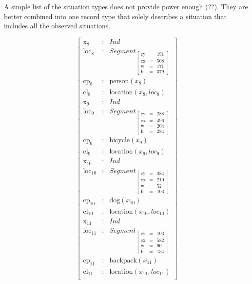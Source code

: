\documentclass[11pt, a4paper]{article}
\begin{document}
A simple list of the situation types does not provide power enough (??).
They are better combined into one record type that solely describes a situation that includes all the observed situations.

\begin{equation}\label{eq:sitmerge}
\left[\begin{array}{rcl}
\text{x}_\text{8} &:& Ind\\
\text{loc}_\text{8} &:& Segment_{\left[\begin{array}{rcl}
	\text{cy} &=& 191\\
	\text{cx} &=& 508\\
	\text{w} &=& 171\\
	\text{h} &=& 379
	\end{array}\right]}\\
\text{cp}_\text{8} &:& \text{person}(x_{8})\\
\text{cl}_\text{8} &:& \text{location}(x_{8}, loc_{8})\\
\text{x}_\text{9} &:& Ind\\
\text{loc}_\text{9} &:& Segment_{\left[\begin{array}{rcl}
	\text{cy} &=& 288\\
	\text{cx} &=& 496\\
	\text{w} &=& 204\\
	\text{h} &=& 284
	\end{array}\right]}\\
\text{cp}_\text{9} &:& \text{bicycle}(x_{9})\\
\text{cl}_\text{9} &:& \text{location}(x_{9}, loc_{9})\\
\text{x}_\text{10} &:& Ind\\
\text{loc}_\text{10} &:& Segment_{\left[\begin{array}{rcl}
	\text{cy} &=& 384\\
	\text{cx} &=& 210\\
	\text{w} &=& 52\\
	\text{h} &=& 103
	\end{array}\right]}\\
\text{cp}_\text{10} &:& \text{dog}(x_{10})\\
\text{cl}_\text{10} &:& \text{location}(x_{10}, loc_{10})\\
\text{x}_\text{11} &:& Ind\\
\text{loc}_\text{11} &:& Segment_{\left[\begin{array}{rcl}
	\text{cy} &=& 103\\
	\text{cx} &=& 582\\
	\text{w} &=& 90\\
	\text{h} &=& 134
	\end{array}\right]}\\
\text{cp}_\text{11} &:& \text{backpack}(x_{11})\\
\text{cl}_\text{11} &:& \text{location}(x_{11}, loc_{11})\\
\end{array}\right]\end{equation}
\end{document}
